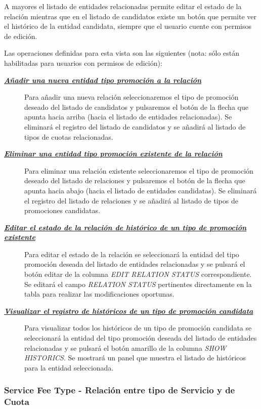 A mayores el listado de entidades relacionadas permite editar el estado de la relación mientras que en el listado de candidatos existe un botón que permite ver el histórico de la entidad candidata, siempre que el usuario cuente con permisos de edición.


Las operaciones definidas para esta vista son las siguientes (nota: sólo están habilitadas para usuarios con permisos de edición):
\begin{description}
\item[\underline{\textsl{\textbf{Añadir una nueva entidad tipo promoción a la relación}}}] Para añadir una nueva relación seleccionaremos el tipo de promoción deseado del listado de candidatos y pulsaremos el botón de la flecha que apunta hacia arriba (hacia el listado de entidades relacionadas). Se eliminará el registro del listado de candidatos y se añadirá al listado de tipos de cuotas relacionadas.

\item[\underline{\textsl{\textbf{Eliminar una entidad tipo promoción existente de la relación}}}] Para eliminar una relación existente seleccionaremos el tipo de promoción deseado del listado de relaciones y pulsaremos el botón de la flecha que apunta hacia abajo (hacia el listado de entidades candidatas). Se eliminará el registro del listado de relaciones y se añadirá al listado de tipos de promociones candidatas.

\item[\underline{\textsl{\textbf{Editar el estado de la relación de histórico de un tipo de promoción existente}}}] Para editar el estado de la relación se seleccionará la entidad del tipo promoción  deseada del listado de entidades relacionadas y se pulsará el botón editar de la columna \textit{EDIT RELATION STATUS} correspondiente. Se editará el campo \emph{RELATION STATUS}  pertinentes directamente en la tabla para realizar las modificaciones oportunas.

\item[\underline{\textsl{\textbf{Visualizar el registro de históricos de un tipo de promoción candidata}}}] Para visualizar todos los históricos de un tipo de promoción candidata se seleccionará la entidad del tipo promoción deseada del listado de entidades relacionadas y se pulsará el botón amarillo de la columna \textit{SHOW HISTORICS}. Se mostrará un panel que muestra el listado de históricos para la entidad seleccionada. 
\end{description}


\subsubsection{Service Fee Type - Relación entre tipo de Servicio y de Cuota}
\label{sub:product-fee-type-relation}

